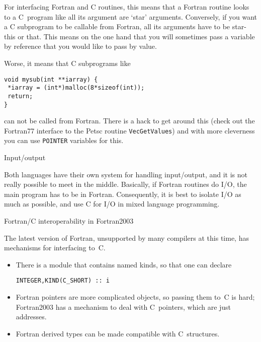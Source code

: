 For interfacing Fortran and C routines, this means that a Fortran
routine looks to a C~program like all its argument are `star'
arguments. Conversely, if you want a C subprogram to be callable from
Fortran, all its arguments have to be star-this or that. This means on
the one hand that you will sometimes pass a variable by reference that
you would like to pass by value.

Worse, it means that C subprograms like
\begin{verbatim}
void mysub(int **iarray) {
 *iarray = (int*)malloc(8*sizeof(int));
 return;
}
\end{verbatim}
can not be called from Fortran. There is a hack to get around this
(check out the Fortran77 interface to the Petsc routine
\texttt{VecGetValues}) and with more cleverness you can use
\texttt{POINTER} variables for this.

 {Input/output}

Both languages have their own system for handling input/output, and it
is not really possible to meet in the middle. Basically, if Fortran
routines do I/O, the main program has to be in Fortran. Consequently,
it is best to isolate I/O as much as possible, and use C for I/O in
mixed language programming.

 {Fortran/C interoperability in Fortran2003}

The latest version of Fortran, unsupported by many compilers at this
time, has mechanisms for interfacing to~C.
\begin{itemize}
\item There is a module that contains named kinds, so that one can declare
\begin{verbatim}
INTEGER,KIND(C_SHORT) :: i
\end{verbatim}
\item Fortran pointers are more complicated objects, so passing them
  to~C is hard; Fortran2003 has a mechanism to deal with C~pointers,
  which are just addresses.
\item Fortran derived types can be made compatible with C~structures.
\end{itemize}

